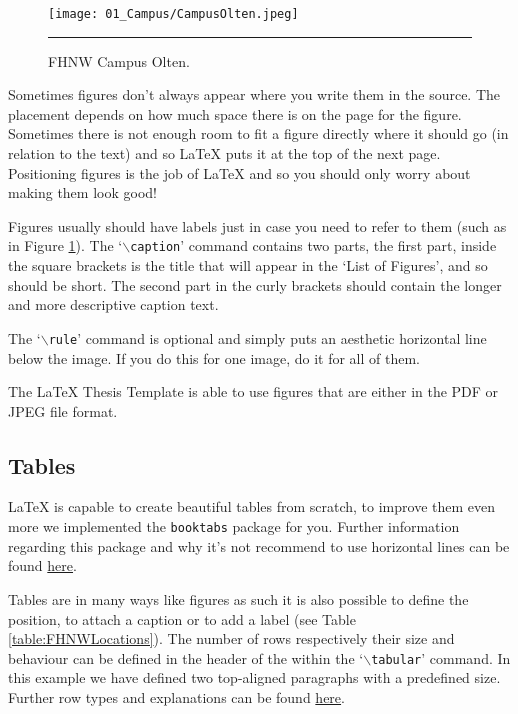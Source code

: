 \begin{figure}[htbp]
	\centering
		\texttt{[image: 01\_Campus/CampusOlten.jpeg]}
		\rule{35em}{0.5pt}
	\caption[Campus Olten]{FHNW Campus Olten.}
	\label{fig:Campus}
\end{figure}

Sometimes figures don't always appear where you write them in the source. The placement depends on how much space there is on the page for the figure. Sometimes there is not enough room to fit a figure directly where it should go (in relation to the text) and so \LaTeX{} puts it at the top of the next page. Positioning figures is the job of \LaTeX{} and so you should only worry about making them look good!

Figures usually should have labels just in case you need to refer to them (such as in Figure \ref{fig:Campus}). The `$\backslash$\texttt{caption}' command contains two parts, the first part, inside the square brackets is the title that will appear in the `List of Figures', and so should be short. The second part in the curly brackets should contain the longer and more descriptive caption text.

The `$\backslash$\texttt{rule}' command is optional and simply puts an aesthetic horizontal line below the image. If you do this for one image, do it for all of them.

The \LaTeX{} Thesis Template is able to use figures that are either in the PDF or JPEG file format.

\subsection{Tables}

\LaTeX{} is capable to create beautiful tables from scratch, to improve them even more we implemented the \texttt{booktabs} package for you. Further information regarding this package and why it's not recommend to use horizontal lines can be found \href{http://texdoc.net/texmf-dist/doc/latex/booktabs/booktabs.pdf}{here}.

Tables are in many ways like figures as such it is also possible to define the position, to attach a caption or to add a label (see Table \ref{table:FHNWLocations}). The number of rows respectively their size and behaviour can be defined in the header of the within the `$\backslash$\texttt{tabular}' command. In this example we have defined two top-aligned paragraphs with a predefined size. Further row types and explanations can be found \href{http://en.wikibooks.org/wiki/LaTeX/Tables}{here}. 

